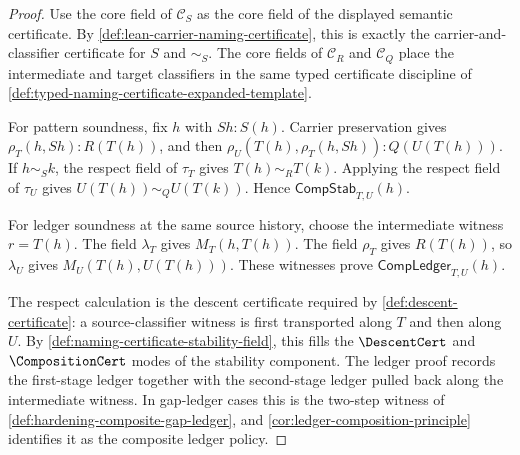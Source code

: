 \begin{proof}
Use the core field of $\mathcal{C}_S$ as the core field of the displayed semantic certificate. By \autoref{def:lean-carrier-naming-certificate}, this is exactly the carrier-and-classifier certificate for $S$ and $\sim_S$. The core fields of $\mathcal{C}_R$ and $\mathcal{C}_Q$ place the intermediate and target classifiers in the same typed certificate discipline of \autoref{def:typed-naming-certificate-expanded-template}.

For pattern soundness, fix $h$ with $Sh:S(h)$. Carrier preservation gives $\rho_T(h,Sh):R(T(h))$, and then $\rho_U(T(h),\rho_T(h,Sh)):Q(U(T(h)))$. If $h\sim_S k$, the respect field of $\tau_T$ gives $T(h)\sim_R T(k)$. Applying the respect field of $\tau_U$ gives $U(T(h))\sim_Q U(T(k))$. Hence $\mathsf{CompStab}_{T,U}(h)$.

For ledger soundness at the same source history, choose the intermediate witness $r=T(h)$. The field $\lambda_T$ gives $M_T(h,T(h))$. The field $\rho_T$ gives $R(T(h))$, so $\lambda_U$ gives $M_U(T(h),U(T(h)))$. These witnesses prove $\mathsf{CompLedger}_{T,U}(h)$.

The respect calculation is the descent certificate required by \autoref{def:descent-certificate}: a source-classifier witness is first transported along $T$ and then along $U$. By \autoref{def:naming-certificate-stability-field}, this fills the $\DescentCert$ and $\CompositionCert$ modes of the stability component. The ledger proof records the first-stage ledger together with the second-stage ledger pulled back along the intermediate witness. In gap-ledger cases this is the two-step witness of \autoref{def:hardening-composite-gap-ledger}, and \autoref{cor:ledger-composition-principle} identifies it as the composite ledger policy.
\end{proof}

